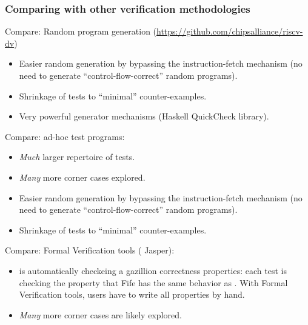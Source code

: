 
\begin{frame}[fragile]
\frametitle{Comparing {\TESTRIG} with other verification methodologies}

\begin{center}\scriptsize
 \begin{minipage}{0.9\textwidth}

  Compare: Random program generation (\url{https://github.com/chipsalliance/riscv-dv})
  \begin{itemize}

    \item Easier random generation by bypassing the instruction-fetch
          mechanism (no need to generate ``control-flow-correct''
          random programs).

    \item Shrinkage of tests to ``minimal'' counter-examples.

    \item Very powerful generator mechanisms (Haskell QuickCheck library).
  \end{itemize}

  \vspace*{2ex}

  Compare: ad-hoc test programs:
  \begin{itemize}

    \item \emph{Much} larger repertoire of tests.

    \item \emph{Many} more corner cases explored.

    \item Easier random generation by bypassing the instruction-fetch
          mechanism (no need to generate ``control-flow-correct''
          random programs).

    \item Shrinkage of tests to ``minimal'' counter-examples.
  \end{itemize}

  \vspace*{2ex}

  Compare: Formal Verification tools ({\eg} Jasper):
  \begin{itemize}

    \item {\TESTRIG} is automatically checkeing a gazillion
      correctness properties: each test is checking the property that
      Fife has the same behavior as {\SAIL}.  With Formal Verification
      tools, users have to write all properties by hand.

    \item \emph{Many} more corner cases are likely explored.

  \end{itemize}
 \end{minipage}
\end{center}

\end{frame}

